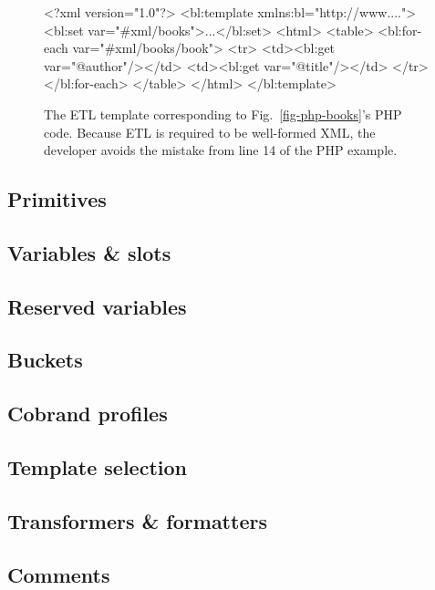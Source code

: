 \documentclass{www2003-submission}
\newcommand{\figref}[1]{Fig.~\ref{fig-#1}}
\begin{document}
\begin{figure}[htbp]
\begin{listing}{1}
<?xml version="1.0"?>
<bl:template xmlns:bl="http://www....">
 <bl:set var="#xml/books">...</bl:set>
 <html>
  <table>
   <bl:for-each var="#xml/books/book">
    <tr> 
     <td><bl:get var="@author"/></td>
     <td><bl:get var="@title"/></td>
    </tr>
   </bl:for-each>
  </table>
 </html>
</bl:template>
\end{listing}%
\caption{The ETL template corresponding to \figref{php-books}'s PHP
code. Because ETL is required to be well-formed XML, the developer
avoids the mistake from line 14 of the PHP example.
\label{fig-etl-books}}
\end{figure}

\subsection{Primitives}

\subsection{Variables \& slots}

\subsection{Reserved variables}

\subsection{Buckets}

\subsection{Cobrand profiles}

\subsection{Template selection}


\subsection{Transformers \& formatters}

\subsection{Comments}
\end{document}
